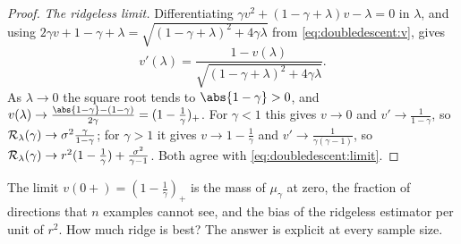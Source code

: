 \begin{refsection}
\begin{proof}
\emph{The ridgeless limit.} Differentiating $\gamma v^2+(1-\gamma+\lambda)v-\lambda=0$ in $\lambda$, and using $2\gamma v+1-\gamma+\lambda=\sqrt{(1-\gamma+\lambda)^2+4\gamma\lambda}$ from \eqref{eq:doubledescent:v}, gives
\[
  v'(\lambda)=\frac{1-v(\lambda)}{\sqrt{(1-\gamma+\lambda)^2+4\gamma\lambda}} .
\]
As $\lambda\to0$ the square root tends to $\abs{1-\gamma}>0$, and $v(\lambda)\to\frac{\abs{1-\gamma}-(1-\gamma)}{2\gamma}=(1-\frac1\gamma)_+$. For $\gamma<1$ this gives $v\to0$ and $v'\to\frac1{1-\gamma}$, so $\mathcal{R}_\lambda(\gamma)\to\sigma^2\frac\gamma{1-\gamma}$; for $\gamma>1$ it gives $v\to1-\frac1\gamma$ and $v'\to\frac1{\gamma(\gamma-1)}$, so $\mathcal{R}_\lambda(\gamma)\to r^2(1-\frac1\gamma)+\frac{\sigma^2}{\gamma-1}$. Both agree with \eqref{eq:doubledescent:limit}.
\end{proof}

The limit $v(0+)=(1-\frac1\gamma)_+$ is the mass of $\mu_\gamma$ at zero, the fraction of directions that $n$ examples cannot see, and the bias of the ridgeless estimator per unit of $r^2$. How much ridge is best? The answer is explicit at every sample size.



\end{refsection}
